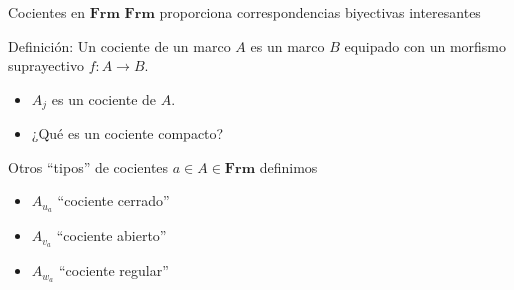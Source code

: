 \documentclass[compress,12pt]{beamer}
\begin{document}
\begin{frame}{Cocientes en $\mathbf{Frm}$}
$\mathbf{Frm}$ proporciona correspondencias biyectivas interesantes

\end{frame}

\begin{frame}
\begin{block}{Definición:}
    Un cociente de un marco $A$ es un marco $B$ equipado con un morfismo suprayectivo $f\colon A\to B$.
\end{block}
\begin{itemize}
\item<3-> $A_j$ es un cociente de $A$.
\item<4-> ¿Qué es un cociente compacto?
\end{itemize}
\end{frame}

\begin{frame}{Otros ``tipos'' de cocientes}
    $a\in A\in \mathbf{Frm}$ definimos
    
    \begin{itemize}
    \item<3-> $A_{u_a}$ ``cociente cerrado'' 
    \item<4-> $A_{v_a}$ ``cociente abierto'' 
    \item<5-> $A_{w_a}$ ``cociente regular'' 
    \end{itemize}
    
    \end{frame}
\end{document}
